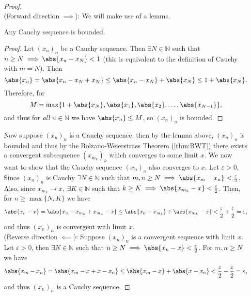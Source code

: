 \documentclass[../real_analysis.tex]{subfiles}
\begin{document}
            \begin{proof}\\
                (Forward direction $\implies$): We will make use of a lemma.
                \begin{lemma}
                    Any Cauchy sequence is bounded.
                \end{lemma}
                \begin{proof}
                    Let $(x_n)_n$ be a Cauchy sequence. Then $\exists N\in\mathbb{N}$ such that $n\geq N\implies\abs{x_n-x_N}<1$ (this is equivalent to the definition of Cauchy with $m=N$). Then
                    \begin{equation}
                        \abs{x_n}=\abs{x_n-x_N+x_N}\leq\abs{x_n-x_N}+\abs{x_N}\leq 1+\abs{x_N}.
                    \end{equation}
                    Therefore, for
                    \begin{equation}
                        M=\max\{1+\abs{x_N},\abs{x_1},\abs{x_2},\dots,\abs{x_{N-1}}\},
                    \end{equation}
                    and thus for \textit{all} $n\in\mathbb{N}$ we have $\abs{x_n}\leq M$, so $(x_n)_n$ is bounded.
                \end{proof}
                Now suppose $(x_n)_n$ is a Cauchy sequence, then by the lemma above, $(x_n)_n$ is bounded and thus by the Bolzano-Weierstrass Theorem (\ref{thm:BWT}) there exists a convergent subsequence $(x_{m_k})_k$ which converges to some limit $x$. We now want to show that the Cauchy sequence $(x_n)_n$ also converges to $x$. Let $\varepsilon>0$, Since $(x_n)_n$ is Cauchy $\exists N\in\mathbb{N}$ such that $m,n\geq N\implies\abs{x_m-x_n}<\frac{\varepsilon}{2}$. Also, since $x_{m_k}\to x,\ \exists K\in\mathbb{N}$ such that $k\geq K\implies\abs{x_{m_k}-x}<\frac{\varepsilon}{2}$. Then, for $n\geq\max\{N,K\}$ we have
                \begin{equation}
                    \abs{x_n-x}=\abs{x_n-x_{m_n}+x_{m_n}-x}\leq\abs{x_n-x_{m_k}}+\abs{x_{m_k}-x}<\frac{\varepsilon}{2}+\frac{\varepsilon}{2}=\varepsilon,
                \end{equation}
                and thus $(x_n)_n$ is convergent with limit $x$.\\
                (Reverse direction $\impliedby$): Suppose $(x_n)_n$ is a convergent sequence with limit $x$. Let $\varepsilon>0$, then $\exists N\in\mathbb{N}$ such that $n\geq N\implies\abs{x_n-x}<\frac{\varepsilon}{2}$. For $m,n\geq N$ we have
                \begin{equation}
                    \abs{x_m-x_n}=\abs{x_m-x+x-x_n}\leq\abs{x_m-x}+\abs{x-x_n}<\frac{\varepsilon}{2}+\frac{\varepsilon}{2}=\varepsilon,
                \end{equation}
                and thus $(x_n)_n$ is a Cauchy sequence.
            \end{proof}
\end{document}
